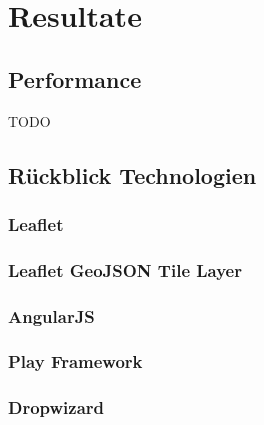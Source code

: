 \chapter{Resultate}
\section{Performance}
TODO
\section{Rückblick Technologien}
\subsection*{Leaflet}
\subsection*{Leaflet GeoJSON Tile Layer}
\subsection*{AngularJS}
\subsection*{Play Framework}
\subsection*{Dropwizard}